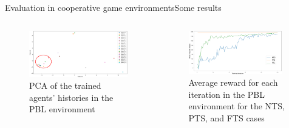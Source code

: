 \begin{frame}{Evaluation in cooperative game environments}{Some results}

    \begin{columns}

        \begin{column}{0.5\textwidth}
            \begin{figure}[h!]
                \centering
                \includegraphics[width=\textwidth]{figures/prahom_pca_analysis.png}
                \caption*{PCA of the trained agents' histories in the PBL environment}
                \label{fig:prahom_pca_analysis}
            \end{figure}
        \end{column}

        \hspace{1ex}

        \begin{column}{0.5\textwidth}
            \begin{figure}[h!]
                \centering
                \includegraphics[width=0.95\textwidth]{figures/prahom_learning_curve.png}
                \caption*{Average reward for each iteration in the PBL environment for the NTS, PTS, and FTS cases}
                \label{fig:prahom_learning_curve}
            \end{figure}
        \end{column}

    \end{columns}

\end{frame}

